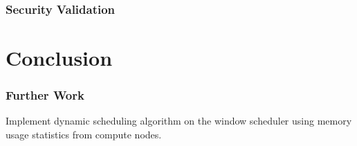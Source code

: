 \documentclass[oneside,12pt]{memoir}
\begin{document}
\subsection{Security Validation}
\chapter{Conclusion}
\subsection{Further Work}
Implement dynamic scheduling algorithm on the window scheduler using memory usage statistics from compute nodes. 



\end{document}
